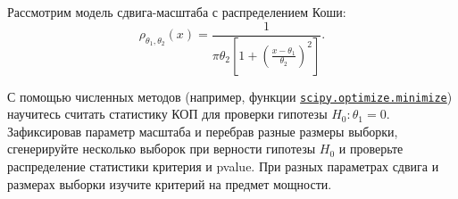 \begin{problem}\label{minimizing_cauchy}
	Рассмотрим модель сдвига-масштаба с распределением Коши:
	$$\rho_{\theta_1, \theta_2}(x) = \frac{1}{\pi\theta_2\left[1+\left(\frac{x - \theta_1}{\theta_2}\right)^2\right]}.$$
	
	С помощью численных методов (например, функции \href{https://docs.scipy.org/doc/scipy/reference/generated/scipy.optimize.minimize.html}{\texttt{scipy.optimize.minimize}}) научитесь считать статистику КОП для проверки гипотезы $H_0\colon \theta_1 = 0$. Зафиксировав параметр масштаба и перебрав разные размеры выборки, сгенерируйте несколько выборок при верности гипотезы $H_0$ и проверьте распределение статистики критерия и pvalue. При разных параметрах сдвига и размерах выборки изучите критерий на предмет мощности.
\end{problem}



